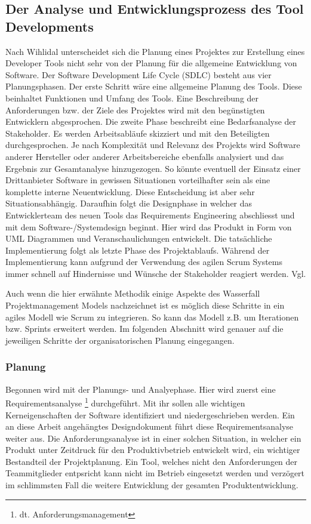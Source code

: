 \documentclass[pagesize, paper=a4, fontsize=12pt, titlepage=true, headings=small, headnosepline, abstractoff, liststotoc, nochapterprefix, plainheadsepline, twoside]{scrreprt}
\begin{document}
\subsection{Der Analyse und Entwicklungsprozess des Tool Developments}
Nach Wihlidal unterscheidet sich die Planung eines Projektes zur Erstellung eines Developer Tools nicht sehr von der Planung für die allgemeine Entwicklung von Software. Der Software Development Life Cycle (SDLC) besteht aus vier Planungsphasen. Der erste Schritt wäre eine allgemeine Planung des Tools. Diese beinhaltet Funktionen und Umfang des Tools. Eine Beschreibung der Anforderungen bzw. der Ziele des Projektes wird mit den begünstigten Entwicklern abgesprochen. Die zweite Phase beschreibt eine Bedarfsanalyse der Stakeholder. Es werden Arbeitsabläufe skizziert und mit den Beteiligten durchgesprochen. Je nach Komplexität und Relevanz des Projekts wird Software anderer Hersteller oder anderer Arbeitsbereiche ebenfalls analysiert und das Ergebnis zur Gesamtanalyse hinzugezogen. So könnte eventuell der Einsatz einer Drittanbieter Software in gewissen Situationen vorteilhafter sein als eine komplette interne Neuentwicklung. Diese Entscheidung ist aber sehr Situationsabhängig. Daraufhin folgt die Designphase in welcher das Entwicklerteam des neuen Tools das Requirements Engineering abschliesst und mit dem Software-/Systemdesign beginnt. Hier wird das Produkt in Form von UML Diagrammen und Veranschaulichungen entwickelt. Die tatsächliche Implementierung folgt als letzte Phase des Projektablaufs. Während der Implementierung kann aufgrund der Verwendung des agilen Scrum Systems immer schnell auf Hindernisse und Wünsche der Stakeholder reagiert werden. Vgl. \parencite[S. 37-40]{Wihlidal2006}

Auch wenn die hier erwähnte Methodik einige Aspekte des Wasserfall Projektmanagement Models nachzeichnet ist es möglich diese Schritte in ein agiles Modell wie Scrum zu integrieren. So kann das Modell z.B. um Iterationen bzw. Sprints erweitert werden. Im folgenden Abschnitt wird genauer auf die jeweiligen Schritte der organisatorischen Planung eingegangen.

\subsubsection{Planung}
Begonnen wird mit der Planungs- und Analyephase. Hier wird zuerst eine Requirementsanalyse \footnote{dt. Anforderungsmanagement} durchgeführt. Mit ihr sollen alle wichtigen Kerneigenschaften der Software identifiziert und niedergeschrieben werden. Ein an diese Arbeit angehängtes Designdokument führt diese Requirementsanalyse weiter aus. Die Anforderungsanalyse ist in einer solchen Situation, in welcher ein Produkt unter Zeitdruck für den Produktivbetrieb entwickelt wird, ein wichtiger Bestandteil der Projektplanung. Ein Tool, welches nicht den Anforderungen der Teammitglieder entpsricht kann nicht im Betrieb eingesetzt werden und verzögert im schlimmsten Fall die weitere Entwicklung der gesamten Produktentwicklung.
\end{document}
